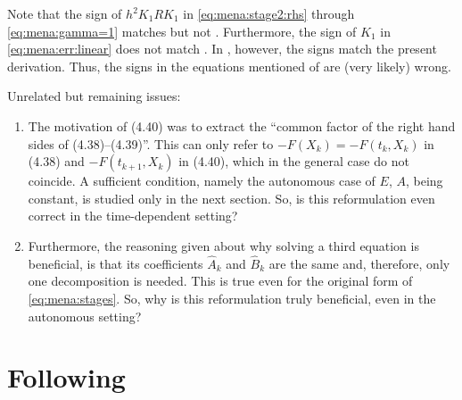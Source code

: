 Note that the sign of $h^2 K_1RK_1$ in
\eqref{eq:mena:stage2:rhs} through \eqref{eq:mena:gamma=1}
matches \cite[Equation~(4.40)]{Mena2007} but not \cite[Equations (4.43) and (4.47)]{Mena2007}.
Furthermore, the sign of $K_1$ in \eqref{eq:mena:err:linear} does not match \cite[Equation~(4.47)]{Mena2007}.
In \cite[Algorithm 4.3.1]{Mena2007}, however, the signs match the present derivation.
Thus, the signs in the equations mentioned of \cite{Mena2007} are (very likely) wrong.

Unrelated but remaining issues:
\begin{enumerate}
  \item
    The motivation of (4.40) was to extract the \enquote{common factor of the right hand sides of (4.38)--(4.39)}.
    This can only refer to $-F(X_k) = -F(t_k, X_k)$ in (4.38) and $-F(t_{k+1}, X_k)$ in (4.40),
    which in the general case do not coincide.
    A sufficient condition, namely the autonomous case of $E$, $A$, \etc being constant,
    is studied only in the next section.
    So, is this reformulation even correct in the time-dependent setting?
  \item
    Furthermore, the reasoning given about why solving a third equation is beneficial,
    is that its coefficients $\hat{A}_k$ and $\hat{B}_k$ are the same and, therefore, only one decomposition is needed.
    This is true even for the original form of \eqref{eq:mena:stages}.
    So, why is this reformulation truly beneficial, even in the autonomous setting?
\end{enumerate}

\section{Following \cite{MPIMD11-06}}

